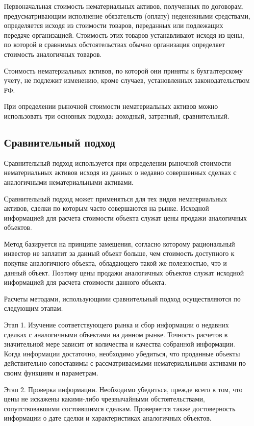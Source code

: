 Первоначальная стоимость нематериальных активов, полученных по договорам, предусматривающим исполнение обязательств (оплату) неденежными средствами, определяется исходя из стоимости товаров, переданных или подлежащих передаче организацией. Стоимость этих товаров устанавливают исходя из цены, по которой в сравнимых обстоятельствах обычно организация определяет стоимость аналогичных товаров.

Стоимость нематериальных активов, по которой они приняты к бухгалтерскому учету, не подлежит изменению, кроме случаев, установленных законодательством РФ.

При определении рыночной стоимости нематериальных активов можно использовать три основных подхода: доходный, затратный, сравнительный.

\subsection{Сравнительный подход}

Сравнительный подход используется при определении рыночной стоимости нематериальных активов исходя из данных о недавно совершенных сделках с аналогичными нематериальными активами. 

Сравнительный подход может применяться для тех видов нематериальных активов, сделки по которым часто совершаются на рынке. Исходной информацией для расчета стоимости объекта служат цены продажи аналогичных объектов.

Метод базируется на принципе замещения, согласно которому рациональный инвестор не заплатит за данный объект больше, чем стоимость доступного к покупке аналогичного объекта, обладающего такой же полезностью, что и данный объект. Поэтому цены продажи аналогичных объектов служат исходной информацией для расчета стоимости данного объекта.

Расчеты методами, использующими сравнительный подход осуществляются по следующим этапам.

Этап 1. Изучение соответствующего рынка и сбор информации о недавних сделках с аналогичными объектами на данном рынке. Точность расчетов в значительной мере зависит от количества и качества собранной информации. Когда информации достаточно, необходимо убедиться, что проданные объекты действительно сопоставимы с рассматриваемыми нематериальными активами по своим функциям и параметрам.

Этап 2. Проверка информации. Необходимо убедиться, прежде всего в том, что цены не искажены какими-либо чрезвычайными обстоятельствами, сопутствовавшими состоявшимся сделкам. Проверяется также достоверность информации о дате сделки и характеристиках аналогичных объектов.

